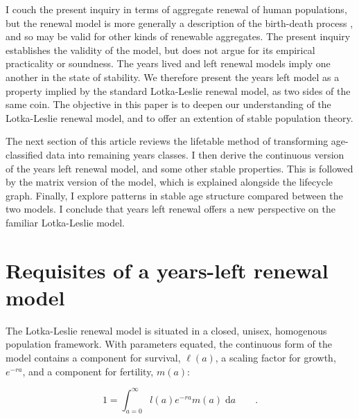\documentclass[12pt,oneside,a4paper,leqno]{article}
\newcommand{\dd}{\; \mathrm{d}}
\newcommand{\ep}{\quad\quad\text{.}}
\begin{document}
I couch the present inquiry in terms of aggregate renewal of human populations,
but the renewal model is more generally a description of the birth-death
process \citep{cox1962,feller1941integral}, and so may be valid for other kinds
of renewable aggregates.
The present inquiry establishes the validity of the model, but does not argue
for its empirical practicality or soundness.
The years lived and left renewal models imply one another in the state of stability. We
therefore present the years left model as a property implied by the
standard Lotka-Leslie renewal model, as two sides of the same coin. The objective in this paper is to deepen
our understanding of the Lotka-Leslie renewal model, and to offer an extention
of stable population theory.

The next section of this article reviews the lifetable method of transforming
age-classified data into remaining years classes. I then derive the continuous version of
the years left renewal model, and some other stable properties. This is
followed by the matrix version of the model, which is explained alongside the
lifecycle graph. Finally, I explore patterns in stable age structure compared
between the two models. I conclude that years left renewal offers
a new perspective on the familiar Lotka-Leslie model.

\section*{Requisites of a years-left renewal model}
The Lotka-Leslie renewal model \citep{sharpe1911problem, leslie1945use} is
situated in a closed, unisex, homogenous population framework. With
parameters equated, the continuous form of the model contains a component for
survival, $\ell(a)$, a scaling factor for growth, $e^{-ra}$, and a component for fertility, $m(a)$:

\begin{equation}
\label{eq:lotka}
1 = \int_{a=0}^\infty l(a)e^{-ra}m(a)\dd a \ep
\end{equation}
\end{document}

